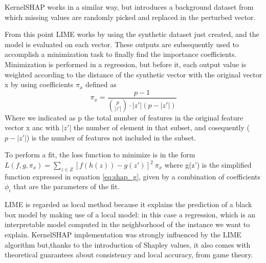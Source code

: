 \documentclass[11pt]{report}
\begin{document}
KernelSHAP works in a similar way, but introduces a background dataset from which missing values are randomly picked and replaced in the perturbed vector.


From this point LIME works by using the synthetic dataset just created, and the model is evaluated on each vector.
These outputs are subsequently used to accomplish a minimization task to finally find the importance coefficients.
Minimization is performed in a regression, but before it, each output value is weighted according to the distance of the synthetic vector with the original vector x by using coefficients $\pi_x$ defined as
\begin{equation}
\pi_x = \frac{p-1}{{p \choose |z'|} \cdot |z'| (p-|z'|)}
\end{equation}
Where we indicated as p the total number of features in the original feature vector x anc with $|z'|$ the number of element in that subset, and cosequently ($p-|z'|$) is the number of features not included in the subset.

To perform a fit, the loss function to minimize is in the form $L(f, g, \pi_x) = \sum_{z\in Z} [f(h(z))-g(z')]^2\ \pi_x$
where g(z') is the simplified function expressed in equation \ref{eq:shap_g}, given by a combination of coefficients $\phi_i$ that are the parameters of the fit.

LIME is regarded as local method because it explains the prediction of a black box model by making use of a local model: in this case a regression, which is an interpretable model computed in the neighborhood of the instance we want to explain.
KernelSHAP implementation was strongly influenced by the LIME algorithm but,thanks to the introduction of Shapley values, it also comes with theoretical guarantees about consistency and local accuracy, from game theory.
\end{document}
